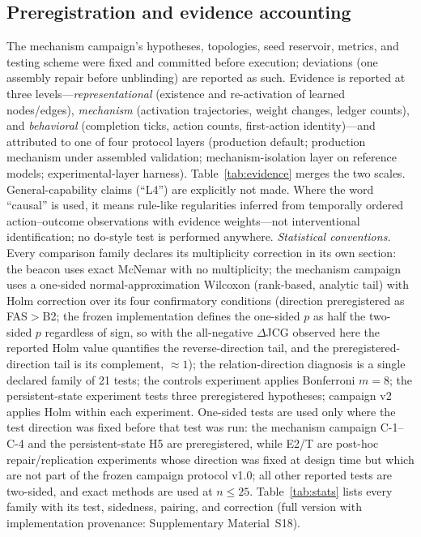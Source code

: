 \documentclass[10pt,a4paper]{article}
\begin{document}
\subsection{Preregistration and evidence accounting}
\label{sec:method-prereg}
The mechanism campaign's hypotheses, topologies, seed reservoir, metrics, and testing scheme were fixed and committed before execution; deviations (one assembly repair before unblinding) are reported as such. Evidence is reported at three levels---\emph{representational} (existence and re-activation of learned nodes/edges), \emph{mechanism} (activation trajectories, weight changes, ledger counts), and \emph{behavioral} (completion ticks, action counts, first-action identity)---and attributed to one of four protocol layers (production default; production mechanism under assembled validation; mechanism-isolation layer on reference models; experimental-layer harness). Table~\ref{tab:evidence} merges the two scales. General-capability claims (``L4'') are explicitly not made. Where the word ``causal'' is used, it means rule-like regularities inferred from temporally ordered action--outcome observations with evidence weights---not interventional identification; no do-style test is performed anywhere. \emph{Statistical conventions.} Every comparison family declares its multiplicity correction in its own section: the beacon uses exact McNemar with no multiplicity; the mechanism campaign uses a one-sided normal-approximation Wilcoxon (rank-based, analytic tail) with Holm correction over its four confirmatory conditions (direction preregistered as FAS${>}$B2; the frozen implementation defines the one-sided $p$ as half the two-sided $p$ regardless of sign, so with the all-negative $\Delta$JCG observed here the reported Holm value quantifies the reverse-direction tail, and the preregistered-direction tail is its complement, ${\approx}1$); the relation-direction diagnosis is a single declared family of 21 tests; the controls experiment applies Bonferroni $m{=}8$; the persistent-state experiment tests three preregistered hypotheses; campaign v2 applies Holm within each experiment. One-sided tests are used only where the test direction was fixed before that test was run: the mechanism campaign C-1--C-4 and the persistent-state H5 are preregistered, while E2/T are post-hoc repair/replication experiments whose direction was fixed at design time but which are not part of the frozen campaign protocol v1.0; all other reported tests are two-sided, and exact methods are used at $n{\le}25$. Table~\ref{tab:stats} lists every family with its test, sidedness, pairing, and correction (full version with implementation provenance: Supplementary Material~S18).
\end{document}
